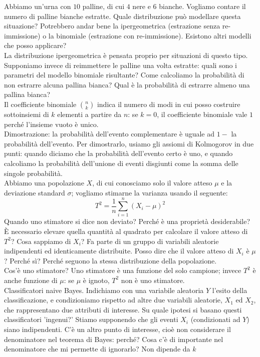 \documentclass{article}
\begin{document}
    Abbiamo un'urna con $ 10 $ palline, di cui $ 4 $ nere e $ 6 $ bianche. Vogliamo contare il numero di palline bianche estratte. Quale distribuzione può modellare questa situazione?
    Potrebbero andar bene la ipergeometrica (estrazione senza re-immissione) o la binomiale (estrazione con re-immissione). Esistono altri modelli che posso applicare? \\
    La distribuzione ipergeometrica è pensata proprio per situazioni di questo tipo. Supponiamo invece di reimmettere le palline una volta estratte: quali sono i parametri del modello
    binomiale risultante? Come calcoliamo la probabilità di non estrarre alcuna pallina bianca? Qual è la probabilità di estrarre almeno una pallina bianca? \\
    Il coefficiente binomiale $ \binom{ n }{ k } $ indica il numero di modi in cui posso costruire sottoinsiemi di $ k $ elementi a partire da $ n $: se $ k = 0 $, il coefficiente
    binomiale vale $ 1 $ perché l'insieme vuoto è unico. \\
    Dimostrazione: la probabilità dell'evento complementare è uguale ad $ 1 - $ la probabilità dell'evento. Per dimostrarlo, usiamo gli assiomi di Kolmogorov in due punti: quando
    diciamo che la probabilità dell'evento certo è uno, e quando calcoliamo la probabilità dell'unione di eventi disgiunti come la somma delle singole probabilità. \\
    Abbiamo una popolazione $ X $, di cui conosciamo solo il valore atteso $ \mu $ e la deviazione standard $ \sigma $; vogliamo stimarne la varianza usando il seguente:
    \[ T^2 = \frac{ 1 }{ n } \sum_{ i = 1 }^n ( X_i - \mu )^2 \]
    Quando uno stimatore si dice non deviato? Perché è una proprietà desiderabile? \\
    È necessario elevare quella quantità al quadrato per calcolare il valore atteso di $ T^2 $? Cosa sappiamo di $ X_i $? Fa parte di un gruppo di variabili aleatorie
    indipendenti ed identicamente distribuite. Posso dire che il valore atteso di $ X_i $ è $ \mu $? Perché sì? Perché seguono la stessa distribuzione della popolazione. \\
    Cos'è uno stimatore? Uno stimatore è una funzione del solo campione; invece $ T^2 $ è anche funzione di $ \mu $: se $ \mu $ è ignoto, $ T^2 $ non è uno stimatore. \\
    Classificatori naive Bayes. Indichiamo con una variabile aleatoria $ Y $ l'esito della classificazione, e condizioniamo rispetto ad altre due variabili aleatorie, $ X_1 $ ed
    $ X_2 $, che rappresentano due attributi di interesse. Su quale ipotesi si basano questi classificatori 'ingenui?' Stiamo supponendo che gli eventi $ X_i $ (condizionati ad
    $ Y $) siano indipendenti. C'è un altro punto di interesse, cioè non considerare il denominatore nel teorema di Bayes: perché? Cosa c'è di importante nel denominatore che mi
    permette di ignorarlo? Non dipende da $ k $ \\
    
\end{document}
